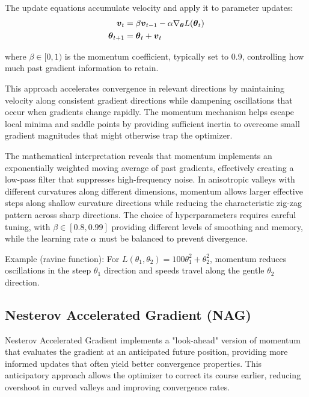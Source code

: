 The update equations accumulate velocity and apply it to parameter updates:
\begin{align}
\boldsymbol{v}_t &= \beta \boldsymbol{v}_{t-1} - \alpha \nabla_{\boldsymbol{\theta}} L(\boldsymbol{\theta}_t) \\
\boldsymbol{\theta}_{t+1} &= \boldsymbol{\theta}_t + \boldsymbol{v}_t
\end{align}

where $\beta \in [0, 1)$ is the momentum coefficient, typically set to 0.9, controlling how much past gradient information to retain.

This approach accelerates convergence in relevant directions by maintaining velocity along consistent gradient directions while dampening oscillations that occur when gradients change rapidly. The momentum mechanism helps escape local minima and saddle points by providing sufficient inertia to overcome small gradient magnitudes that might otherwise trap the optimizer.

The mathematical interpretation reveals that momentum implements an exponentially weighted moving average of past gradients, effectively creating a low-pass filter that suppresses high-frequency noise. In anisotropic valleys with different curvatures along different dimensions, momentum allows larger effective steps along shallow curvature directions while reducing the characteristic zig-zag pattern across sharp directions. The choice of hyperparameters requires careful tuning, with \(\beta\in[0.8,0.99]\) providing different levels of smoothing and memory, while the learning rate \(\alpha\) must be balanced to prevent divergence.\cite{Polyak1964,WebOptimizationDLBook,D2LChapterOptimization}

Example (ravine function): For \(L(\theta_1,\theta_2)=100\theta_1^2+\theta_2^2\), momentum reduces oscillations in the steep \(\theta_1\) direction and speeds travel along the gentle \(\theta_2\) direction.

\subsection{Nesterov Accelerated Gradient (NAG)}

Nesterov Accelerated Gradient implements a "look-ahead" version of momentum that evaluates the gradient at an anticipated future position, providing more informed updates that often yield better convergence properties. This anticipatory approach allows the optimizer to correct its course earlier, reducing overshoot in curved valleys and improving convergence rates.

